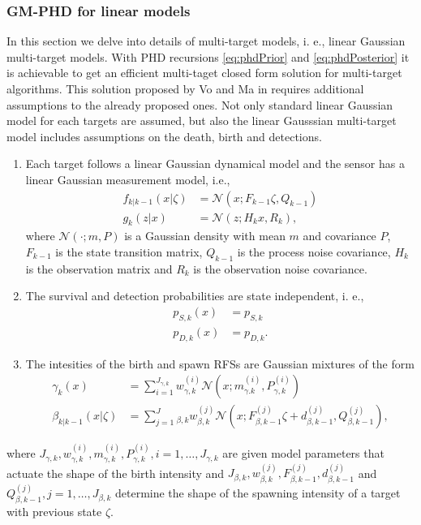         \subsubsection{GM-PHD for linear models}
In this section we delve into details of multi-target models, i. e., linear Gaussian multi-target models. With PHD recursions \eqref{eq:phdPrior} and \eqref{eq:phdPosterior} it is achievable to get an efficient multi-taget closed form solution for multi-target algorithms. This solution proposed by Vo and Ma in \cite{VoMaPHD2006} requires additional assumptions to the already proposed ones. Not only standard linear Gaussian model for each targets are assumed, but also the linear Gausssian multi-target model includes assumptions on the death, birth and detections.
\begin{enumerate}[start=4]
    \item  Each target follows a linear Gaussian dynamical model and the sensor has a linear Gaussian measurement model, i.e., \label{as:phd_4}
        \begin{align}
            f_{k|k-1}(x|\zeta) &= \mathcal{N}(x; F_{k-1}\zeta, Q_{k-1}) \label{eq:phd_linear_model_state}\\
            g_k(z|x) &= \mathcal{N}(z;H_kx, R_k), \label{eq:phd_linear_model_measurements}
        \end{align}
        where $\mathcal{N}(\cdot;m,P)$ is a Gaussian density with mean $m$ and covariance $P$, $F_{k-1}$ is the state transition matrix, $Q_{k-1}$ is the process noise covariance, $H_k$ is the observation matrix and $R_k$ is the observation noise covariance.
    \item The survival and detection probabilities are state independent, i. e., \label{as:phd_5}
        \begin{align}
            p_{S,k}(x) &= p_{S,k} \label{eq:phd_ps}\\
            p_{D,k}(x) &= p_{D,k}. \label{eq:phd_pd}
        \end{align}
    \item The intesities of the birth and spawn RFSs are Gaussian mixtures of the form \label{as:phd_6}
        \begin{align}
            \gamma_k(x) &= \sum_{i=1}^{J_{\gamma,k}}w_{\gamma,k}^{(i)} \mathcal{N}(x; m_{\gamma.k}^{(i)}, P_{\gamma,k}^{(i)}) \label{eq:phd_birth_intensity} \\
            \beta_{k|k-1}(x|\zeta) &= \sum_{j=1}^J_{\beta,k} w_{\beta,k}^{(j)} \mathcal{N}(x;F_{\beta,k-1}^(j)\zeta + d_{\beta,k-1}^{(j)}, Q_{\beta,k-1}^{(j)}), \label{eq:phd_spawning_intensity}
        \end{align}
\end{enumerate}
where $J_{\gamma,k}, w_{\gamma,k}^{(i)}, m_{\gamma,k}^{(i)}, P_{\gamma,k}^{(i)}, i=1,\dots, J_{\gamma,k}$ are given model parameters that actuate the shape of the birth intensity and $J_{\beta,k}, w_{\beta,k}^{(j)}, F_{\beta,k-1}^{(j)}, d_{\beta,k-1}^{(j)}$ and $Q_{\beta,k-1}^{(j)}, j=1,\dots, J_{\beta,k}$ determine the shape of the spawning intensity of a target with previous state $\zeta$.

